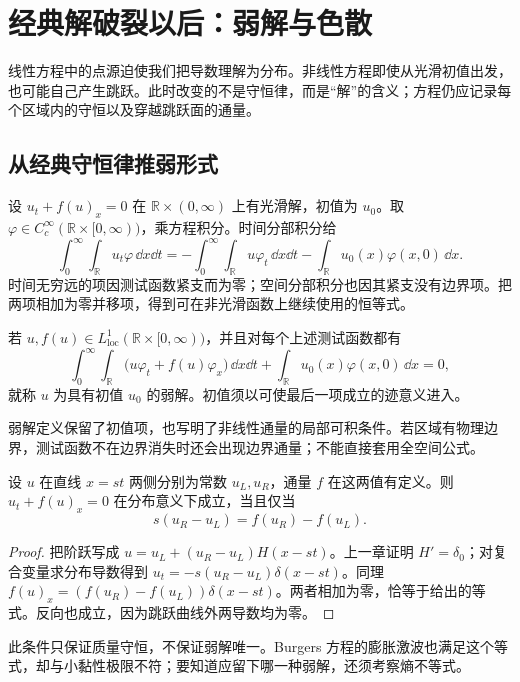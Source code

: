 \chapter{经典解破裂以后：弱解与色散}
\label{chap:math-pde}

线性方程中的点源迫使我们把导数理解为分布。非线性方程即使从光滑初值出发，也可能自己产生跳跃。此时改变的不是守恒律，而是“解”的含义；方程仍应记录每个区域内的守恒以及穿越跳跃面的通量。

\section{从经典守恒律推弱形式}

设 \(u_t+f(u)_x=0\) 在 \(\mathbb R\times(0,\infty)\) 上有光滑解，初值为 \(u_0\)。取 \(\varphi\in C_c^\infty(\mathbb R\times[0,\infty))\)，乘方程积分。时间分部积分给
\[
\int_0^\infty\!\int_{\mathbb R}u_t\varphi\,\dd x\dd t
=-\int_0^\infty\!\int_{\mathbb R}u\varphi_t\,\dd x\dd t
-\int_{\mathbb R}u_0(x)\varphi(x,0)\,\dd x.
\]
时间无穷远的项因测试函数紧支而为零；空间分部积分也因其紧支没有边界项。把两项相加为零并移项，得到可在非光滑函数上继续使用的恒等式。

\begin{definition}[守恒律的弱解]
若 \(u,f(u)\in L^1_{\mathrm{loc}}(\mathbb R\times[0,\infty))\)，并且对每个上述测试函数都有
\[
\int_0^\infty\!\int_{\mathbb R}
\bigl(u\varphi_t+f(u)\varphi_x\bigr)\,\dd x\dd t
+\int_{\mathbb R}u_0(x)\varphi(x,0)\,\dd x=0,
\]
就称 \(u\) 为具有初值 \(u_0\) 的弱解。初值须以可使最后一项成立的迹意义进入。
\end{definition}

弱解定义保留了初值项，也写明了非线性通量的局部可积条件。若区域有物理边界，测试函数不在边界消失时还会出现边界通量；不能直接套用全空间公式。

\begin{theorem}
设 \(u\) 在直线 \(x=st\) 两侧分别为常数 \(u_L,u_R\)，通量 \(f\) 在这两值有定义。则 \(u_t+f(u)_x=0\) 在分布意义下成立，当且仅当
\[
s(u_R-u_L)=f(u_R)-f(u_L).
\]
\end{theorem}
\begin{proof}
把阶跃写成 \(u=u_L+(u_R-u_L)H(x-st)\)。上一章证明 \(H'=\delta_0\)；对复合变量求分布导数得到 \(u_t=-s(u_R-u_L)\delta(x-st)\)。同理 \(f(u)_x=(f(u_R)-f(u_L))\delta(x-st)\)。两者相加为零，恰等于给出的等式。反向也成立，因为跳跃曲线外两导数均为零。
\end{proof}

此条件只保证质量守恒，不保证弱解唯一。Burgers 方程的膨胀激波也满足这个等式，却与小黏性极限不符；要知道应留下哪一种弱解，还须考察熵不等式。

